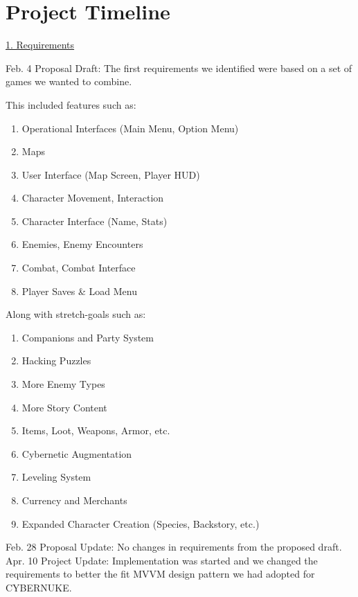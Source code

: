 \documentclass[10pt,conference,onecolumn,compsoc]{IEEEtran}
\begin{document}
\pagebreak
\section{Project Timeline}

\underline{1. Requirements}
\vspace{5px}

Feb. 4 Proposal Draft: The first requirements we identified were based on a set of games we wanted to combine. 

This included features such as:
\begin{enumerate}
\item Operational Interfaces (Main Menu, Option Menu)
\item Maps
\item User Interface (Map Screen, Player HUD)
\item Character Movement, Interaction
\item Character Interface (Name, Stats)
\item Enemies, Enemy Encounters
\item Combat, Combat Interface
\item Player Saves \& Load Menu
\end{enumerate}

Along with stretch-goals such as:
\begin{enumerate}
\item Companions and Party System
\item Hacking Puzzles
\item More Enemy Types
\item More Story Content
\item Items, Loot, Weapons, Armor, etc.
\item Cybernetic Augmentation
\item Leveling System
\item Currency and Merchants
\item Expanded Character Creation (Species, Backstory, etc.)\\
\end{enumerate}

Feb. 28 Proposal Update: 
No changes in requirements from the proposed draft.\\

Apr. 10 Project Update: 
Implementation was started and we changed the requirements to better the fit MVVM design pattern we had adopted for CYBERNUKE.
\end{document}
